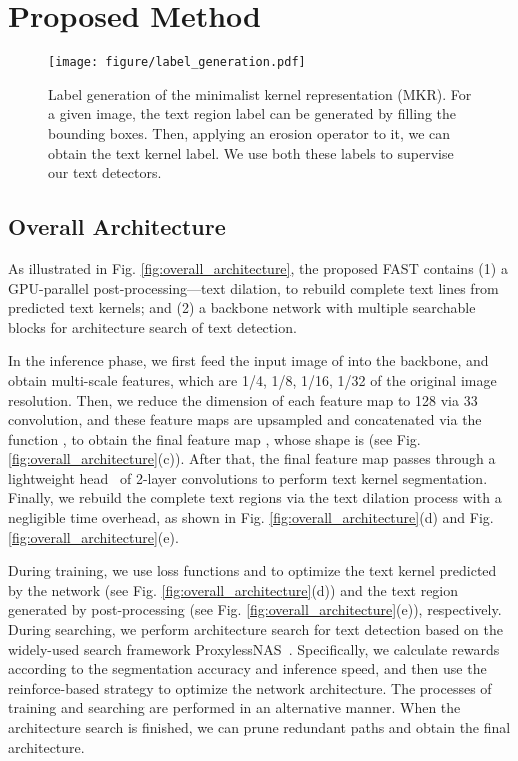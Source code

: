 \documentclass[lettersize,journal]{IEEEtran}
\begin{document}
\section{Proposed Method}

\begin{figure}[tbp]
    \centering
    \texttt{[image: figure/label\_generation.pdf]}
    \caption{
    Label generation of the minimalist kernel representation (MKR).
    For a given image, the text region label can be generated by filling the bounding boxes. Then,  applying an erosion operator to it, we can obtain the text kernel label.
    We use both these labels to supervise our text detectors.
    }
    \label{fig:label_generation}
\end{figure}

\subsection{Overall Architecture}

As illustrated in Fig. \ref{fig:overall_architecture}, the proposed FAST contains (1) a GPU-parallel post-processing---text dilation, to rebuild complete text lines from predicted text kernels; and (2) a backbone network with multiple searchable blocks  for architecture search of text detection.


In the inference phase, we first feed the input image of  into the backbone, and obtain multi-scale features, which are 1/4, 1/8, 1/16, 1/32 of the original image resolution.
Then, we reduce the dimension of each feature map to 128 via 33 convolution, and these feature maps are upsampled and concatenated via the function , to obtain the final feature map , whose shape is  (see Fig. \ref{fig:overall_architecture}(c)).
After that, the final feature map  passes through a lightweight head~\cite{wang2019efficient} of 2-layer convolutions to perform text kernel segmentation.
Finally, we rebuild the complete text regions via the text dilation process with a negligible time overhead, as shown in Fig. \ref{fig:overall_architecture}(d) and Fig. \ref{fig:overall_architecture}(e).



During training, we use loss functions  and  to optimize the text kernel predicted by the network (see Fig. \ref{fig:overall_architecture}(d)) and the text region generated by post-processing (see Fig. \ref{fig:overall_architecture}(e)), respectively.
During searching, we perform architecture search for text detection based on 
the widely-used search framework ProxylessNAS~\cite{cai2018proxylessnas}.
Specifically, we calculate rewards according to the segmentation accuracy and inference speed, and then use the reinforce-based strategy to optimize the network architecture.
The processes of training and searching are performed in an alternative manner. When the  architecture search is finished, we can prune redundant paths and obtain the final architecture.
\end{document}
